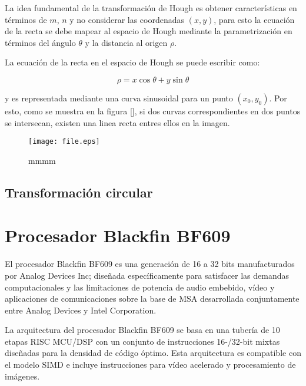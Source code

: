 La idea fundamental de la transformación de Hough es obtener características en términos de $m$, $n$ y no considerar las coordenadas $(x,y)$, para esto la ecuación de la recta se debe mapear al espacio de Hough mediante la parametrización en términos del ángulo $\theta$ y la distancia al origen $\rho$.%




%


La ecuación de la recta en el espacio de Hough se puede escribir como:

\begin{equation}
\rho = x\cos\theta + y\sin\theta
\end{equation}

y es representada mediante una curva sinusoidal para un punto $(x_{0},y_{0})$. Por esto, como se muestra en la figura [], si dos curvas correspondientes en dos puntos se intersecan, existen una linea recta entres ellos en la imagen.

\begin{figure}[hbtp]
\texttt{[image: file.eps]}
\caption{mmmm}
\end{figure}

  
\subsection{Transformación circular}



\section{Procesador Blackfin BF609}

El procesador Blackfin BF609 es una generación de 16 a 32 bits manufacturados por Analog Devices Inc; diseñada específicamente para satisfacer las demandas computacionales y las limitaciones de potencia de audio embebido, vídeo y aplicaciones de comunicaciones sobre la base de MSA desarrollada conjuntamente entre Analog Devices y Intel Corporation\cite{GanKuo2007}. 

La arquitectura del procesador Blackfin BF609 se basa en una tubería de 10 etapas RISC MCU/DSP con un conjunto de instrucciones 16-/32-bit mixtas diseñadas para la densidad de código óptimo. Esta arquitectura es compatible con el modelo SIMD\cite{Lawson1992} e incluye instrucciones para vídeo acelerado y procesamiento de imágenes.  

